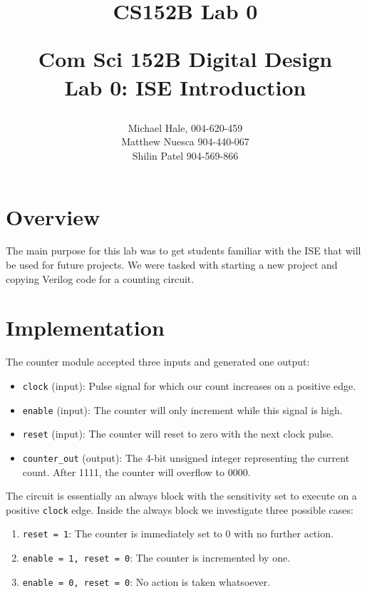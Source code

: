 \documentclass[11pt]{article}
\title{CS152B Lab 0}
\begin{document}
	
\title{\vspace{-0.5in} Com Sci 152B Digital Design \\
	Lab 0: ISE Introduction \\
	\author{Michael Hale, 004-620-459 \\ Matthew Nuesca 904-440-067 \\ Shilin Patel 904-569-866}}
\date{}
\maketitle

\section*{Overview}
The main purpose for this lab was to get students familiar with the ISE that will be used for future projects. We were tasked with starting a new project and copying Verilog code for a counting circuit. 

\section*{Implementation}
The counter module accepted three inputs and generated one output:
\begin{itemize}
	\item \texttt{clock} (input): Pulse signal for which our count increases on a positive edge.
	
	\item \texttt{enable} (input): The counter will only increment while this signal is high.
	
	\item \texttt{reset} (input): The counter will reset to zero with the next clock pulse. 
	
	\item \texttt{counter\_out} (output): The 4-bit unsigned integer representing the current count. After 1111, the counter will overflow to 0000. 
\end{itemize}

The circuit is essentially an always block with the sensitivity set to execute on a positive \texttt{clock} edge. Inside the always block we investigate three possible cases:

\begin{enumerate}
	\item \texttt{reset = 1}: The counter is immediately set to 0 with no further action.
	\item \texttt{enable = 1, reset = 0}: The counter is incremented by one.
	\item \texttt{enable = 0, reset = 0}: No action is taken whatsoever.
\end{enumerate}
\end{document}
